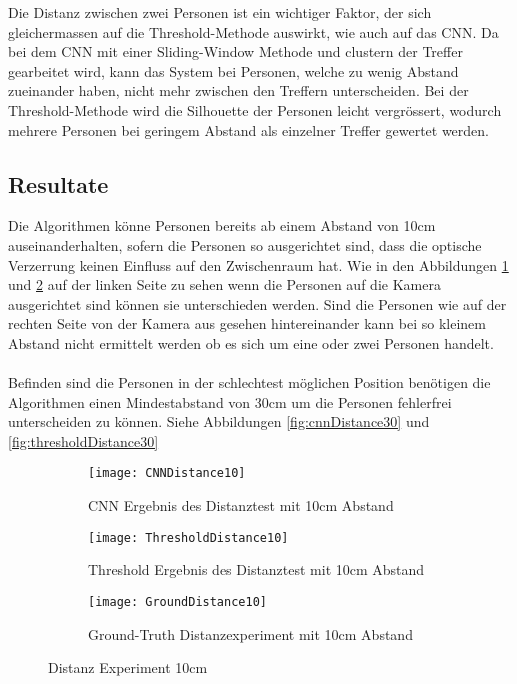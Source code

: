 Die Distanz zwischen zwei Personen ist ein wichtiger Faktor, der sich gleichermassen auf die Threshold-Methode auswirkt, wie auch auf das \gls{CNN}. Da bei dem \gls{CNN} mit einer Sliding-Window Methode und clustern der Treffer gearbeitet wird, kann das System bei Personen, welche zu wenig Abstand zueinander haben, nicht mehr zwischen den Treffern unterscheiden. Bei der Threshold-Methode wird die Silhouette der Personen leicht vergrössert, wodurch mehrere Personen bei geringem Abstand als einzelner Treffer gewertet werden.

\subsection{Resultate}

Die Algorithmen könne Personen bereits ab einem Abstand von 10cm auseinanderhalten, sofern die Personen so ausgerichtet sind, dass die optische Verzerrung keinen Einfluss auf den Zwischenraum hat. Wie in den Abbildungen \ref{fig:cnnDistance10} und \ref{fig:thresholdDistance10} auf der linken Seite zu sehen wenn die Personen auf die Kamera ausgerichtet sind können sie unterschieden werden. Sind die Personen wie auf der rechten Seite von der Kamera aus gesehen hintereinander kann bei so kleinem Abstand nicht ermittelt werden ob es sich um eine oder zwei Personen handelt.\\
\\
Befinden sind die Personen in der schlechtest möglichen Position benötigen die Algorithmen einen Mindestabstand von 30cm um die Personen fehlerfrei unterscheiden zu können. Siehe Abbildungen \ref{fig:cnnDistance30} und \ref{fig:thresholdDistance30}

\begin{figure}[H]
	\begin{subfigure}{.45\linewidth}
		\centering
		\texttt{[image: CNNDistance10]}
		\caption{CNN Ergebnis des Distanztest mit 10cm Abstand}
		\label{fig:cnnDistance10}
	\end{subfigure}\hfill%
	\begin{subfigure}{.45\linewidth}
		\centering
		\texttt{[image: ThresholdDistance10]}
		\caption{Threshold Ergebnis des Distanztest mit 10cm Abstand}
		\label{fig:thresholdDistance10}
	\end{subfigure}
	\begin{subfigure}{\linewidth}
		\centering
		\texttt{[image: GroundDistance10]}
		\caption{Ground-Truth Distanzexperiment mit 10cm Abstand}
		\label{fig:groundDistance10}
	\end{subfigure}
	\caption{Distanz Experiment 10cm}
	\label{fig:Distance10}
\end{figure}



